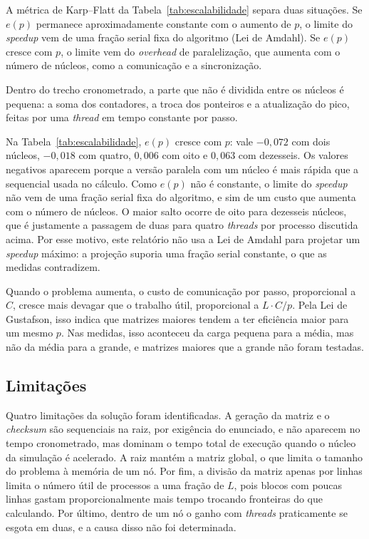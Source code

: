 \documentclass[11pt,a4paper]{article}
\begin{document}
A métrica de Karp--Flatt da Tabela~\ref{tab:escalabilidade} separa duas situações. Se $e(p)$ permanece aproximadamente constante com o aumento de $p$, o limite do \emph{speedup} vem de uma fração serial fixa do algoritmo (Lei de Amdahl). Se $e(p)$ cresce com $p$, o limite vem do \emph{overhead} de paralelização, que aumenta com o número de núcleos, como a comunicação e a sincronização.

Dentro do trecho cronometrado, a parte que não é dividida entre os núcleos é pequena: a soma dos contadores, a troca dos ponteiros e a atualização do pico, feitas por uma \emph{thread} em tempo constante por passo.

Na Tabela~\ref{tab:escalabilidade}, $e(p)$ cresce com $p$: vale $-0{,}072$ com dois núcleos, $-0{,}018$ com quatro, $0{,}006$ com oito e $0{,}063$ com dezesseis. Os valores negativos aparecem porque a versão paralela com um núcleo é mais rápida que a sequencial usada no cálculo. Como $e(p)$ não é constante, o limite do \emph{speedup} não vem de uma fração serial fixa do algoritmo, e sim de um custo que aumenta com o número de núcleos. O maior salto ocorre de oito para dezesseis núcleos, que é justamente a passagem de duas para quatro \emph{threads} por processo discutida acima. Por esse motivo, este relatório não usa a Lei de Amdahl para projetar um \emph{speedup} máximo: a projeção suporia uma fração serial constante, o que as medidas contradizem.

Quando o problema aumenta, o custo de comunicação por passo, proporcional a $C$, cresce mais devagar que o trabalho útil, proporcional a $L \cdot C/p$. Pela Lei de Gustafson, isso indica que matrizes maiores tendem a ter eficiência maior para um mesmo $p$. Nas medidas, isso aconteceu da carga pequena para a média, mas não da média para a grande, e matrizes maiores que a grande não foram testadas.

\subsection{Limitações}

Quatro limitações da solução foram identificadas. A geração da matriz e o \emph{checksum} são sequenciais na raiz, por exigência do enunciado, e não aparecem no tempo cronometrado, mas dominam o tempo total de execução quando o núcleo da simulação é acelerado. A raiz mantém a matriz global, o que limita o tamanho do problema à memória de um nó. Por fim, a divisão da matriz apenas por linhas limita o número útil de processos a uma fração de $L$, pois blocos com poucas linhas gastam proporcionalmente mais tempo trocando fronteiras do que calculando. Por último, dentro de um nó o ganho com \emph{threads} praticamente se esgota em duas, e a causa disso não foi determinada.
\end{document}
